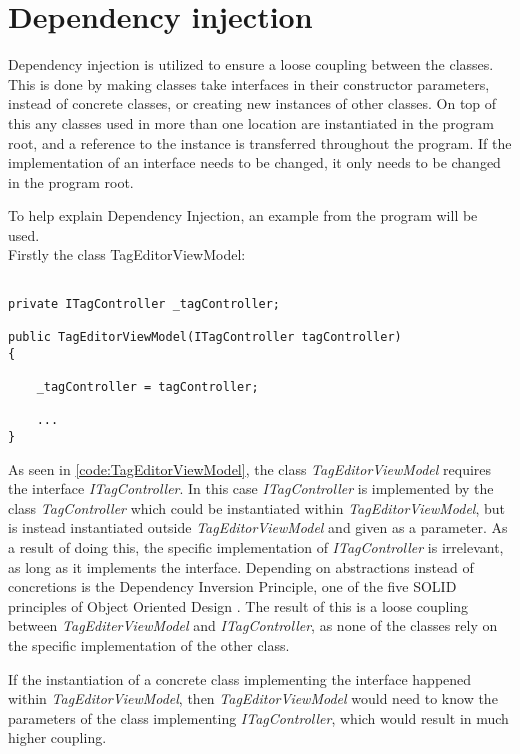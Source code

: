 \section{Dependency injection} \label{sc:DependencyInjection}
Dependency injection is utilized to ensure a loose coupling between the classes. This is done by making classes take interfaces in their constructor parameters, instead of concrete classes, or creating new instances of other classes. On top of this any classes used in more than one location are instantiated in the program root, and a reference to the instance is transferred throughout the program. If the implementation of an interface needs to be changed, it only needs to be changed in the program root. \par
To help explain Dependency Injection, an example from the program will be used.\\
Firstly the class TagEditorViewModel:

\begin{listing}[H]
\begin{verbatim}

private ITagController _tagController;

public TagEditorViewModel(ITagController tagController)
{
    
    _tagController = tagController;
    
    ...
}

\end{verbatim}
\label{code:TagEditorViewModel}
\end{listing}

As seen in \autoref{code:TagEditorViewModel}, the class \textit{TagEditorViewModel} requires the interface \textit{ITagController}. In this case \textit{ITagController} is implemented by the class \textit{TagController} which could be instantiated within \textit{TagEditorViewModel}, but is instead instantiated outside  \textit{TagEditorViewModel} and given as a parameter. As a result of doing this, the specific implementation of \textit{ITagController} is irrelevant, as long as it implements the interface. Depending on abstractions instead of concretions is the Dependency Inversion Principle, one of the five SOLID principles of Object Oriented Design \citep{AgilePPP}.
The result of this is a loose coupling between \textit{TagEditerViewModel} and \textit{ITagController}, as none of the classes rely on the specific implementation of the other class.
\par
If the instantiation of a concrete class implementing the interface happened within \textit{TagEditorViewModel}, then \textit{TagEditorViewModel} would need to know the parameters of the class implementing \textit{ITagController}, which would result in much higher coupling.
\par


